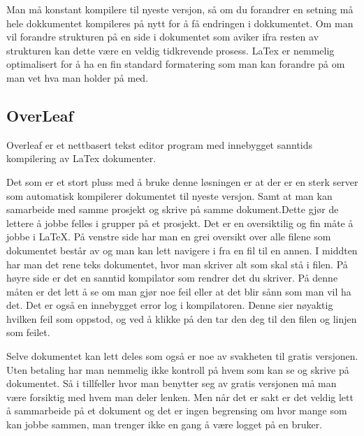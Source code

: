 \hspace{-17pt}Man må konstant kompilere til nyeste versjon, så om du forandrer en setning må hele dokkumentet kompileres på nytt for å få endringen i dokkumentet. Om man vil forandre strukturen på en side i dokumentet som aviker ifra resten av strukturen kan dette være en veldig tidkrevende prosess.
LaTex er nemmelig optimalisert for å ha en fin standard formatering som man kan forandre på om man vet hva man holder på med.\newline

\newpage


\subsection{OverLeaf}
\vspace{10pt}

Overleaf er et nettbasert tekst editor program med innebygget sanntids kompilering av LaTex dokumenter.\newline

\hspace{-17pt}Det som er et stort pluss med å bruke denne løsningen er at der er en sterk server som automatisk kompilerer dokumentet til nyeste versjon. Samt at man kan samarbeide med samme prosjekt og skrive på samme dokument.Dette gjør de lettere å jobbe felles i grupper på et prosjekt. Det er en oversiktilig og fin måte å jobbe i LaTeX. På venstre side har man en grei oversikt over alle filene som dokumentet består av og man kan lett navigere i fra en fil til en annen. I middten har man det rene teks dokumentet, hvor man skriver alt som skal stå i filen.
På høyre side er det en sanntid kompilator som rendrer det du skriver. På denne måten er det lett å se om man gjør noe feil eller at det blir sånn som man vil ha det. Det er også en innebygget error log i kompilatoren. Denne sier nøyaktig hvilken feil som oppstod, og ved å klikke på den tar den deg til den filen og linjen som feilet.\newline

\hspace{-17pt}Selve dokumentet kan lett deles som også er noe av svakheten til gratis versjonen. Uten betaling har man nemmelig ikke kontroll på hvem som kan se og skrive på dokumentet. Så i tillfeller hvor man benytter seg av gratis versjonen må man være forsiktig med hvem man deler lenken. Men når det er sakt er det veldig lett å sammarbeide på et dokument og det er ingen begrensing om hvor mange som kan jobbe sammen, man trenger ikke en gang å være logget på en bruker.\newline

